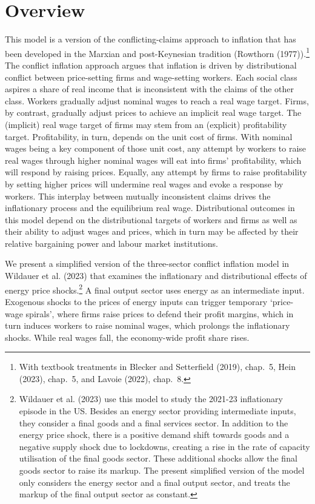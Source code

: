 \documentclass[
  letterpaper,
  DIV=11,
  numbers=noendperiod]{scrreprt}
\begin{document}
\section{Overview}\label{overview-7}

This model is a version of the conflicting-claims approach to inflation
that has been developed in the Marxian and post-Keynesian tradition
(Rowthorn (1977)).\footnote{With textbook treatments in Blecker and
  Setterfield (2019), chap.~5, Hein (2023), chap.~5, and Lavoie (2022),
  chap.~8.} The conflict inflation approach argues that inflation is
driven by distributional conflict between price-setting firms and
wage-setting workers. Each social class aspires a share of real income
that is inconsistent with the claims of the other class. Workers
gradually adjust nominal wages to reach a real wage target. Firms, by
contrast, gradually adjust prices to achieve an implicit real wage
target. The (implicit) real wage target of firms may stem from an
(explicit) profitability target. Profitability, in turn, depends on the
unit cost of firms. With nominal wages being a key component of those
unit cost, any attempt by workers to raise real wages through higher
nominal wages will eat into firms' profitability, which will respond by
raising prices. Equally, any attempt by firms to raise profitability by
setting higher prices will undermine real wages and evoke a response by
workers. This interplay between mutually inconsistent claims drives the
inflationary process and the equilibrium real wage. Distributional
outcomes in this model depend on the distributional targets of workers
and firms as well as their ability to adjust wages and prices, which in
turn may be affected by their relative bargaining power and labour
market institutions.

We present a simplified version of the three-sector conflict inflation
model in Wildauer et al. (2023) that examines the inflationary and
distributional effects of energy price shocks.\footnote{Wildauer et al.
  (2023) use this model to study the 2021-23 inflationary episode in the
  US. Besides an energy sector providing intermediate inputs, they
  consider a final goods and a final services sector. In addition to the
  energy price shock, there is a positive demand shift towards goods and
  a negative supply shock due to lockdowns, creating a rise in the rate
  of capacity utilisation of the final goods sector. These additional
  shocks allow the final goods sector to raise its markup. The present
  simplified version of the model only considers the energy sector and a
  final output sector, and treats the markup of the final output sector
  as constant.} A final output sector uses energy as an intermediate
input. Exogenous shocks to the prices of energy inputs can trigger
temporary `price-wage spirals', where firms raise prices to defend their
profit margins, which in turn induces workers to raise nominal wages,
which prolongs the inflationary shocks. While real wages fall, the
economy-wide profit share rises.
\end{document}

